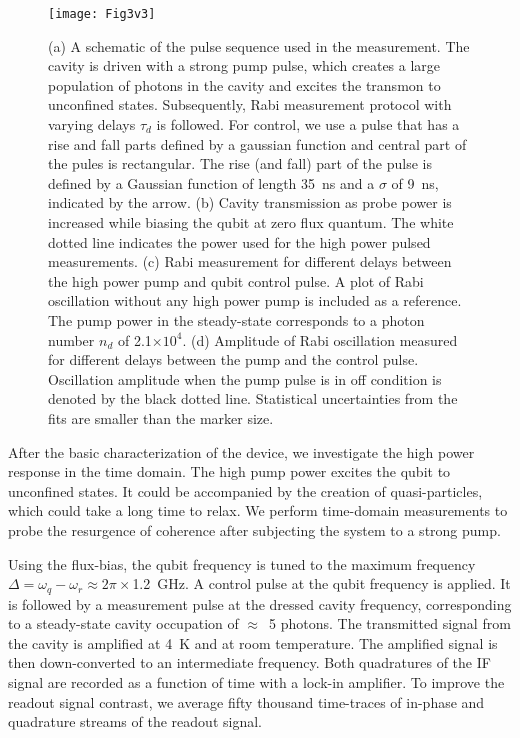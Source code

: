 \documentclass[a4paper, amsfonts, amssymb, amsmath, reprint,showkeys,nofootinbib,superscriptaddress]{revtex4-2}
\begin{document}
%

\begin{figure*}
	\texttt{[image: Fig3v3]}
	\caption{(a) A schematic of the pulse sequence used in the measurement. The 
		cavity is driven with a strong pump pulse, which creates a large 
		population of photons in the cavity and excites the transmon to unconfined 
		states. Subsequently, Rabi measurement protocol with varying delays 
		$\tau_{d}$ is followed. For control, we use a pulse that has a rise and fall 
		parts defined by a gaussian function and central part of the pules is 
		rectangular. The rise (and fall) part of the pulse is defined by a Gaussian
		function of length 35~ns and a $\sigma$ of 9~ns, indicated by
		the arrow.
		(b) Cavity transmission as probe power is increased while biasing the 
		qubit at zero flux quantum. The white dotted line indicates the power used 
		for the high power pulsed measurements. (c) Rabi measurement for different 
		delays between the high power pump and qubit control pulse. 
		A plot of Rabi oscillation without any high power pump is included as a 
		reference. 
		The pump power in the steady-state corresponds to a photon number $n_{d}$ 
		of 2.1$\times10^4$. (d) Amplitude of Rabi oscillation measured for 
		different delays between the pump and the control pulse. 
		Oscillation amplitude when the pump pulse is in off condition is 
		denoted by the black dotted line. Statistical uncertainties from the fits
		are smaller than the marker size.}
	\label{fig3}
\end{figure*}
 
%
After the basic characterization of the device, we investigate the high power 
response in the time domain.
%
The high pump power excites the qubit to unconfined states. It could be 
accompanied by the creation of quasi-particles, which could take a long time to 
relax.
%
We perform time-domain measurements to probe the resurgence of coherence 
after subjecting the system to a strong pump.



Using the flux-bias, the qubit frequency is tuned to the maximum frequency
 $\Delta=\omega_q-\omega_r\approx2\pi\times$1.2~GHz. 
A control pulse at the qubit frequency is applied. It is followed by a measurement pulse at 
the dressed cavity frequency, corresponding to a steady-state cavity occupation of 
$\approx$~5 photons.
%
The transmitted signal from the cavity is amplified at 4~K and at room temperature. 
The amplified signal is then down-converted to an intermediate frequency. 
Both quadratures of the IF signal are recorded as a function of time with a 
lock-in amplifier. To improve the readout signal contrast, we average fifty 
thousand time-traces of in-phase and quadrature streams of the readout signal. 
\end{document}
